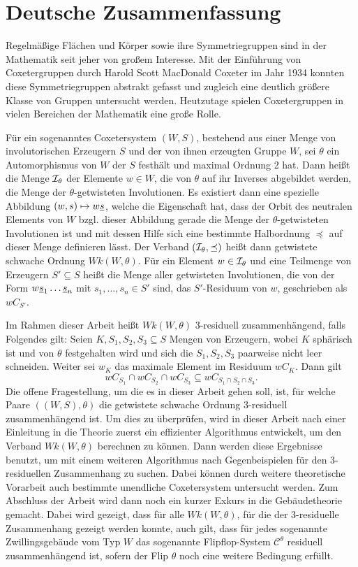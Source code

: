 \chapter*{Deutsche Zusammenfassung}

Regelmäßige Flächen und Körper sowie ihre Symmetriegruppen sind in der Mathe\-matik seit jeher von großem Interesse. Mit der Einführung von Coxetergruppen durch Harold Scott MacDonald Coxeter im Jahr 1934 konnten diese Symmetriegruppen abstrakt gefasst und zugleich eine deutlich größere Klasse von Gruppen untersucht werden. Heutzutage spielen Coxetergruppen in vielen Bereichen der Mathematik eine große Rolle.

Für ein sogenanntes Coxetersystem $(W,S)$, bestehend aus einer Menge von involutorischen Erzeugern $S$ und der von ihnen erzeugten Gruppe $W$, sei $\theta$ ein Automorphismus von $W$ der $S$ festhält und maximal Ordnung 2 hat. Dann heißt die Menge $\mathcal{I}_{\theta}$ der Elemente $w \in W$, die von $\theta$ auf ihr Inverses abgebildet werden, die Menge der $\theta$-getwisteten Involutionen. Es existiert dann eine spezielle Abbildung $(w,s) \mapsto w \underline{s}$, welche die Eigenschaft hat, dass der Orbit des neutralen Elements von $W$ bzgl. dieser Abbildung gerade die Menge der $\theta$-getwisteten Involutionen ist und mit dessen Hilfe sich eine bestimmte Halbordnung $\preceq$ auf dieser Menge definieren lässt. Der Verband $(\mathcal{I}_{\theta},\preceq)$ heißt dann getwistete schwache Ordnung $Wk(W,\theta)$. Für ein Element $w \in \mathcal{I}_{\theta}$ und eine Teilmenge von Erzeugern $S' \subseteq S$ heißt die Menge aller getwisteten Involutionen, die von der Form $w \underline{s}_1 \ldots \underline{s}_n$ mit $s_1,\ldots,s_n \in S'$ sind, das $S'$-Residuum von $w$, geschrieben als $w C_{S'}$.

Im Rahmen dieser Arbeit heißt $Wk(W,\theta)$ 3-residuell zusammenhängend, falls Folgendes gilt: Seien $K,S_1,S_2,S_3 \subseteq S$ Mengen von Erzeugern, wobei $K$ sphärisch ist und von $\theta$ festgehalten wird und sich die $S_1,S_2,S_3$ paarweise nicht leer schneiden. Weiter sei $w_K$ das maximale Element im Residuum $w C_K$. Dann gilt
$$ w C_{S_1} \cap w C_{S_2} \cap w C_{S_3} \subseteq w C_{S_1 \cap S_2 \cap S_3}. $$
Die offene Fragestellung, um die es in dieser Arbeit gehen soll, ist, für welche Paare $((W,S),\theta)$ die getwistete schwache Ordnung 3-residuell zusammenhängend ist. Um dies zu überprüfen, wird in dieser Arbeit nach einer Einleitung in die Theorie zuerst ein effizienter Algorithmus entwickelt, um den Verband $Wk(W,\theta)$ berechnen zu können. Dann werden diese Ergebnisse benutzt, um mit einem weiteren Algorithmus nach Gegenbeispielen für den 3-residuellen Zusammenhang zu suchen. Dabei können durch weitere theoretische Vorarbeit auch bestimmte unendliche Coxetersystem untersucht werden. Zum Abschluss der Arbeit wird dann noch ein kurzer Exkurs in die Gebäudetheorie gemacht. Dabei wird gezeigt, dass für alle $Wk(W,\theta)$, für die der 3-residuelle Zusammenhang gezeigt werden konnte, auch gilt, dass für jedes sogenannte Zwillingsgebäude vom Typ $W$ das sogenannte Flipflop-System $\mathcal{C}^\theta$ residuell zusammenhängend ist, sofern der Flip $\theta$ noch eine weitere Bedingung erfüllt.